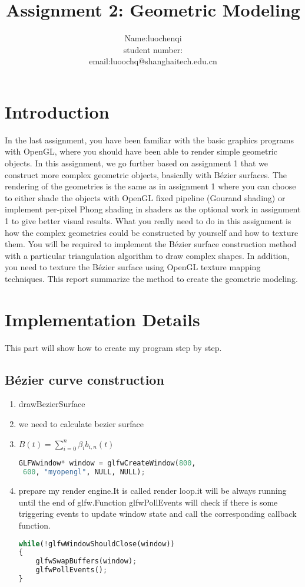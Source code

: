 \documentclass[acmtog]{acmart}
\title{Assignment 2: Geometric Modeling}
\author{Name:\quad luochenqi  \\ student number:\quad 14784547
	\\email:\quad luoochq@shanghaitech.edu.cn}
\begin{document}
\maketitle

\vspace*{2 ex}


\section{Introduction}
In the last assignment, you have been familiar with the basic graphics programs with OpenGL, where you should have been able to render simple geometric objects. In this assignment, we go further based on assignment 1 that we construct more complex geometric objects, basically with Bézier surfaces. The rendering of the geometries is the same as in assignment 1 where you can choose to either shade the objects with OpenGL fixed pipeline (Gourand shading) or implement per-pixel Phong shading in shaders as the optional work in assignment 1 to give better visual results. What you really need to do in this assignment is how the complex geometries could be constructed by yourself and how to texture them. You will be required to implement the Bézier surface construction method with a particular triangulation algorithm to draw complex shapes. In addition, you need to texture the Bézier surface using OpenGL texture mapping techniques.
This report summarize the method to create the geometric modeling.
\section{Implementation Details}
This part will show how to create my program step by step.

\subsection{Bézier curve construction}
\begin{enumerate}
	\item drawBezierSurface
	\item we need to calculate bezier surface 

	\item $B(t)=\sum \limits_{i=0}^n \beta_i b_{i,n}(t)$
    
\begin{lstlisting}[language=Python]
GLFWwindow* window = glfwCreateWindow(800,
 600, "myopengl", NULL, NULL);
\end{lstlisting}
	\item prepare my render engine.It is called render loop.it will be always running until the end of glfw.Function glfwPollEvents will check if there is some triggering events to update window state and call the corresponding callback function.
\begin{lstlisting}[language=Python]
while(!glfwWindowShouldClose(window))
{
    glfwSwapBuffers(window);
    glfwPollEvents();    
}
\end{lstlisting}

\end{enumerate}
\end{document}

